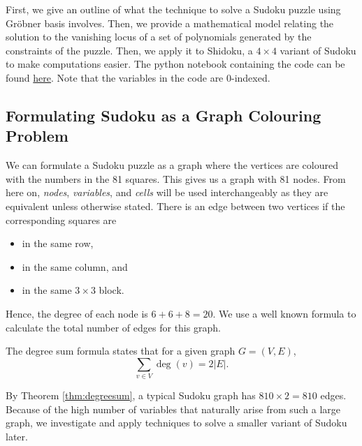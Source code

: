 \documentclass[../main.tex]{subfiles}
\begin{document}
        First, we give an outline of what the technique to solve a Sudoku puzzle using Gr\"obner basis involves. Then, we provide a mathematical model relating the solution to the vanishing locus of a set of polynomials generated by the constraints of the puzzle. Then, we apply it to Shidoku, a $4\times 4$ variant of Sudoku to make computations easier. The python notebook containing the code can be found \href{https://github.com/yangdabei/graph-colouring-and-sudoku/blob/main/example_shidoku.ipynb}{here}. Note that the variables in the code are 0-indexed.

        \subsection{Formulating Sudoku as a Graph Colouring Problem}
        We can formulate a Sudoku puzzle as a graph where the vertices are coloured with the numbers in the 81 squares. This gives us a graph with 81 nodes. From here on, \emph{nodes}, \emph{variables}, and \emph{cells} will be used interchangeably as they are equivalent unless otherwise stated. There is an edge between two vertices if the corresponding squares are 
        \begin{itemize}
            \item in the same row,
            \item in the same column, and 
            \item in the same $3\times 3$ block.            
        \end{itemize}
        Hence, the degree of each node is $6+6+8=20$. We use a well known formula to calculate the total number of edges for this graph.        
        \begin{theorem} \label{thm:degreesum}
            The degree sum formula states that for a given graph $G=(V,E)$,
            $$\sum_{v\in V}\deg(v)=2|E|.$$
        \end{theorem}
        By Theorem \ref{thm:degreesum}, a typical Sudoku graph has $810\times 2=810$ edges. Because of the high number of variables that naturally arise from such a large graph, we investigate and apply techniques to solve a smaller variant of Sudoku later.
\end{document}
